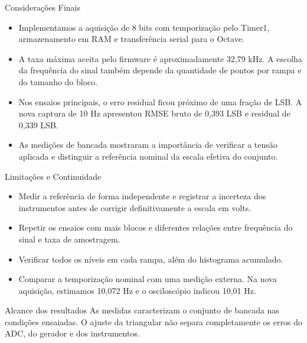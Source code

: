 \begin{frame}{Considerações Finais}
\begin{itemize}
\item Implementamos a aquisição de 8 bits com temporização pelo Timer1, armazenamento em RAM e transferência serial para o Octave.
\item A taxa máxima aceita pelo firmware é aproximadamente 32,79 kHz. A escolha da frequência do sinal também depende da quantidade de pontos por rampa e do tamanho do bloco.
\item Nos ensaios principais, o erro residual ficou próximo de uma fração de LSB. A nova captura de 10 Hz apresentou RMSE bruto de 0,393 LSB e residual de 0,339 LSB.
\item As medições de bancada mostraram a importância de verificar a tensão aplicada e distinguir a referência nominal da escala efetiva do conjunto.
\end{itemize}
\end{frame}

\begin{frame}{Limitações e Continuidade}
\begin{itemize}
\item Medir a referência de forma independente e registrar a incerteza dos instrumentos antes de corrigir definitivamente a escala em volts.
\item Repetir os ensaios com mais blocos e diferentes relações entre frequência do sinal e taxa de amostragem.
\item Verificar todos os níveis em cada rampa, além do histograma acumulado.
\item Comparar a temporização nominal com uma medição externa. Na nova aquisição, estimamos 10,072 Hz e o osciloscópio indicou 10,01 Hz.
\end{itemize}
\begin{block}{Alcance dos resultados}
As medidas caracterizam o conjunto de bancada nas condições ensaiadas. O ajuste da triangular não separa completamente os erros do ADC, do gerador e dos instrumentos.
\end{block}
\end{frame}
